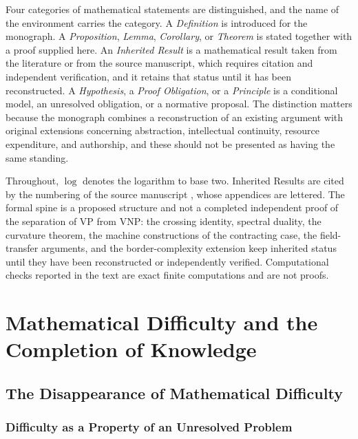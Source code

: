 \documentclass[11pt,letterpaper]{report}
\theoremstyle{plain}
\theoremstyle{definition}
\theoremstyle{remark}
\newcommand{\VP}{\mathrm{VP}}
\newcommand{\VNP}{\mathrm{VNP}}
\begin{document}
Four categories of mathematical statements are distinguished, and the name of the environment carries the category. A \emph{Definition} is introduced for the monograph. A \emph{Proposition}, \emph{Lemma}, \emph{Corollary}, or \emph{Theorem} is stated together with a proof supplied here. An \emph{Inherited Result} is a mathematical result taken from the literature or from the source manuscript, which requires citation and independent verification, and it retains that status until it has been reconstructed. A \emph{Hypothesis}, a \emph{Proof Obligation}, or a \emph{Principle} is a conditional model, an unresolved obligation, or a normative proposal. The distinction matters because the monograph combines a reconstruction of an existing argument with original extensions concerning abstraction, intellectual continuity, resource expenditure, and authorship, and these should not be presented as having the same standing.

Throughout, $\log$ denotes the logarithm to base two. Inherited Results are cited by the numbering of the source manuscript \cite{Source2026}, whose appendices are lettered. The formal spine is a proposed structure and not a completed independent proof of the separation of $\VP$ from $\VNP$: the crossing identity, spectral duality, the curvature theorem, the machine constructions of the contracting case, the field-transfer arguments, and the border-complexity extension keep inherited status until they have been reconstructed or independently verified. Computational checks reported in the text are exact finite computations and are not proofs.

\clearpage

\part{Mathematical Difficulty and the Completion of Knowledge}

\chapter{The Disappearance of Mathematical Difficulty}

\section{Difficulty as a Property of an Unresolved Problem}
\end{document}
